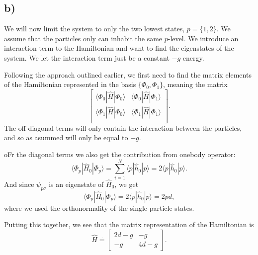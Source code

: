 \documentclass[a4paper, 11pt, notitlepage, english]{article}
\newcommand{\op}[1]{\hat{#1}}
\newcommand{\braopket}[3]{\langle #1 | {#2} | #3 \rangle}
\begin{document}
\subsection*{b)}
We will now limit the system to only the two lowest states, $p=\{1,2\}$. We assume that the particles only can inhabit the same $p$-level. We introduce an interaction term to the Hamiltonian and want to find the eigenstates of the system. We let the interaction term just be a constant $-g$ energy.

Following the approach outlined earlier, we first need to find the matrix elements of the Hamiltonian represented in the basis $\{\Phi_0, \Phi_1\}$, meaning the matrix
$$
\begin{bmatrix}
\braopket{\Phi_0}{\op{H}}{\Phi_0} & \braopket{\Phi_0}{\op{H}}{\Phi_1} \\
\braopket{\Phi_1}{\op{H}}{\Phi_0} & \braopket{\Phi_1}{\op{H}}{\Phi_1} \\
\end{bmatrix}.
$$
The off-diagonal terms will only contain the interaction between the particles, and so as asummed will only be equal to $-g$.

oFr the diagonal terms we also get the contribution from onebody operator:
$$\braopket{\Phi_p}{\op{H}_0}{\Phi_p} = \sum_{i=1}^N \braopket{p}{\op{h}_0}{p} = 2\braopket{p}{\op{h}_0}{p}.$$
And since $\psi_{p\sigma}$ is an eigenstate of $\op{H}_0$, we get
$$\braopket{\Phi_p}{\op{H}_0}{\Phi_p} = 2\braopket{p}{\op{h}_0}{p} = 2pd,$$
where we used the orthonormality of the single-particle states.

Putting this together, we see that the matrix representation of the Hamiltonian is 
$$\op{H} \overset{\cdot}{=} \begin{bmatrix}
2d -g & -g \\
-g & 4d -g 
\end{bmatrix}.$$
\end{document}
